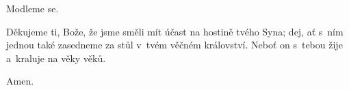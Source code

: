 \mbox{}

Modleme se.

Děkujeme ti, Bože, že jsme směli mít účast na hostině tvého Syna; dej, ať s~ním jednou také zasedneme za stůl v~tvém věčném království. Neboť on s~tebou žije a~kraluje na věky věků.

\Rbardot{} Amen.
